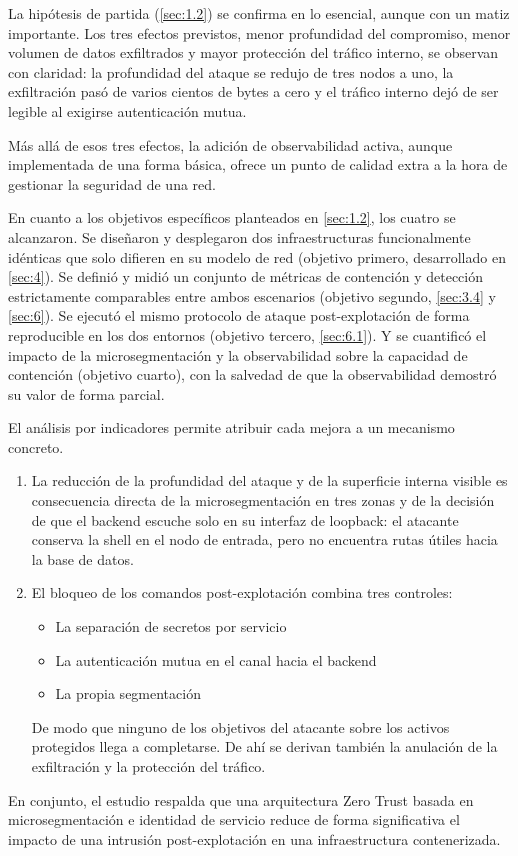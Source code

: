 \documentclass[11pt,spanish,listoffigures,listoftables]{tfgetsinf}
\begin{document}
        La hipótesis de partida (\cref{sec:1.2}) se confirma en lo esencial, aunque con un matiz importante. Los tres efectos previstos, menor profundidad del compromiso, menor volumen de datos exfiltrados y mayor protección del tráfico interno, se observan con claridad: la profundidad del ataque se redujo de tres nodos a uno, la exfiltración pasó de varios cientos de bytes a cero y el tráfico interno dejó de ser legible al exigirse autenticación mutua.

        Más allá de esos tres efectos, la adición de observabilidad activa, aunque implementada de una forma básica, ofrece un punto de calidad extra a la hora de gestionar la seguridad de una red.

        En cuanto a los objetivos específicos planteados en \cref{sec:1.2}, los cuatro se alcanzaron. Se diseñaron y desplegaron dos infraestructuras funcionalmente idénticas que solo difieren en su modelo de red (objetivo primero, desarrollado en \cref{sec:4}). Se definió y midió un conjunto de métricas de contención y detección estrictamente comparables entre ambos escenarios (objetivo segundo, \cref{sec:3.4} y \cref{sec:6}). Se ejecutó el mismo protocolo de ataque post-explotación de forma reproducible en los dos entornos (objetivo tercero, \cref{sec:6.1}). Y se cuantificó el impacto de la microsegmentación y la observabilidad sobre la capacidad de contención (objetivo cuarto), con la salvedad de que la observabilidad demostró su valor de forma parcial.

        El análisis por indicadores permite atribuir cada mejora a un mecanismo concreto. 
        \begin{enumerate}
            \item La reducción de la profundidad del ataque y de la superficie interna visible es consecuencia directa de la microsegmentación en tres zonas y de la decisión de que el backend escuche solo en su interfaz de loopback: el atacante conserva la shell en el nodo de entrada, pero no encuentra rutas útiles hacia la base de datos. 
            \item El bloqueo de los comandos post-explotación combina tres controles: 
                \begin{itemize}
                    \item La separación de secretos por servicio
                    \item La autenticación mutua en el canal hacia el backend 
                    \item La propia segmentación
                \end{itemize}
                De modo que ninguno de los objetivos del atacante sobre los activos protegidos llega a completarse. De ahí se derivan también la anulación de la exfiltración y la protección del tráfico.
        \end{enumerate}
        En conjunto, el estudio respalda que una arquitectura Zero Trust basada en microsegmentación e identidad de servicio reduce de forma significativa el impacto de una intrusión post-explotación en una infraestructura contenerizada. 
        
\end{document}
